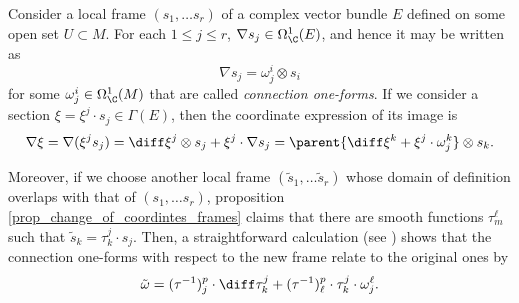 \begin{obs} \label{coordinate_exp_connection}
    Consider a local frame \((s_1, \ldots s_r)\) of a complex vector bundle \(E\) defined on some open set \(U \subset M\). For each \(1 \leq j \leq r\), \(\nabla s_j \in \Omega_\C^1(E)\), and hence it may be written as
    \begin{equation} \label{def_connection_1_form}
    \nabla s_j = \omega^i_j \otimes s_i
    \end{equation}
    for some \(\omega^i_j \in \Omega_\C^1(M)\) that are called \textit{connection one-forms}. If we consider a section \(\xi=\xi^j\cdot  s_j \in \Gamma(E)\), then the coordinate expression of its image is
    \[
    \nabla \xi = \nabla(\xi^j s_j) = \diff \xi^j \otimes s_j + \xi^j \cdot  \nabla s_j = \parent{\diff \xi^k + \xi^j \cdot \omega^k_j} \otimes s_k.
    \]

    Moreover, if we choose another local frame \((\tilde{s}_1, \ldots \tilde{s}_r)\) whose domain of definition overlaps with that of \((s_1, \ldots s_r)\), proposition \ref{prop_change_of_coordintes_frames} claims that there are smooth functions \(\tau^\ell_m\) such that \(\tilde{s}_k=\tau^j_k \cdot s_j\). Then, a straightforward calculation (see \parencite[Page 195]{lee_introCM}) shows that the connection one-forms with respect to the new frame relate to the original ones by
    \begin{eqnarray}\label{eq_transf_connection_one_form}
        \tilde{\omega}=(\tau^{-1})^p_j\cdot \diff \tau^j_k + (\tau^{-1})^p_\ell \cdot \tau^j_k \cdot \omega^\ell_j.
    \end{eqnarray}
\end{obs}

